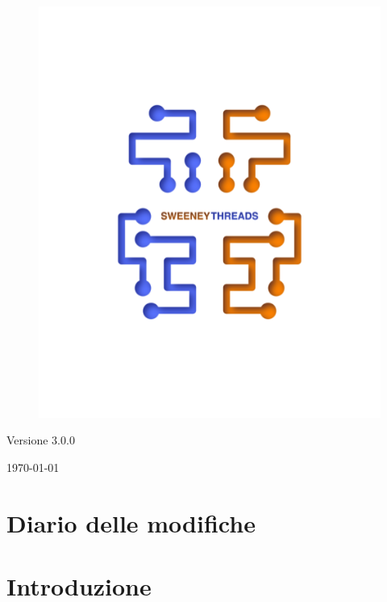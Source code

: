 \documentclass[a4paper]{article}
\begin{document}
\begin{titlepage}
		\begin{figure}[H]
			\centering
			\includegraphics[scale=0.8]{sweeney.png}
		\end{figure}
		\begin{center}
			Versione 3.0.0
		\end{center}
		{\large \today}\\[3cm] 
		\vfill  
	\end{titlepage}
	
	
	\tableofcontents
	
	\newpage
	\section*{Diario delle modifiche}

	\newpage	
	\section{Introduzione}
\end{document}

